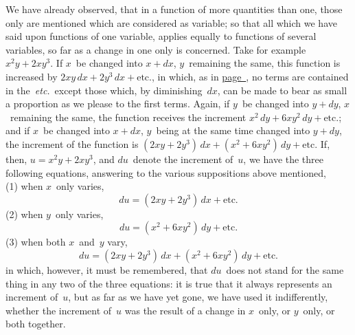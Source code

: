 \documentclass[12pt]{book}[2005/09/16]
\newcommand{\Pagelabel}[1]{\phantomsection\label{page:#1}}
\newcommand{\PageSep}[1]{\Pagelabel{#1}\ignorespaces}
\newcommand{\PageRef}[2][page]{\hyperref[page:#2]{#1~\pageref*{page:#2}}}
\renewcommand{\etc}{\text{etc}}
\renewcommand{\(}{{\upshape(}}
\renewcommand{\)}{{\upshape)}}
\begin{document}
We have already observed, that in a function of
%
%
%
%
more quantities than one, those only are mentioned
which are considered as variable; so that all which
we have said upon functions of one variable, applies
%
equally to functions of several variables, so far as a
%
change in one only is concerned. Take for example
$x^{2} y + 2xy^{3}$. If $x$~be changed into $x + dx$, $y$~remaining
the same, this function is increased by $2xy\, dx + 2y^{3}\, dx + \etc.$,
in which, as in \PageRef{29}, no terms are contained
in the~\emph{etc.}\ except those which, by diminishing~$dx$,
can be made to bear as small a proportion as we
please to the first terms. Again, if $y$~be changed into
$y + dy$, $x$~remaining the same, the function receives
the increment $x^{2}\, dy + 6xy^{2}\, dy + \etc.$; and if $x$~be changed
into $x + dx$, $y$~being at the same time changed into
$y + dy$, the increment of the function is $(2xy + 2y^{3})\, dx + (x^{2} + 6xy^{2})\, dy + \etc$.
If, then, $u = x^{2} y + 2xy^{3}$, and
$du$~denote the increment of~$u$, we have the three following
equations, answering to the various suppositions
above mentioned, \\
(1) when $x$~only varies,
\[
du = (2xy + 2y^{3})\, dx + \etc.
\]
\PageSep{79}
(2) when $y$~only varies,
\[
du = (x^{2} + 6xy^{2})\, dy + \etc.
\]
(3) when both $x$~and~$y$ vary,
\[
du = (2xy + 2y^{3})\, dx + (x^{2} + 6xy^{2})\, dy + \etc.
\]
in which, however, it must be remembered, that $du$~does
not stand for the same thing in any two of the
three equations: it is true that it always represents
an increment of~$u$, but as far as we have yet gone, we
have used it indifferently, whether the increment of~$u$
was the result of a change in $x$~only, or $y$~only, or both
together.
\end{document}

